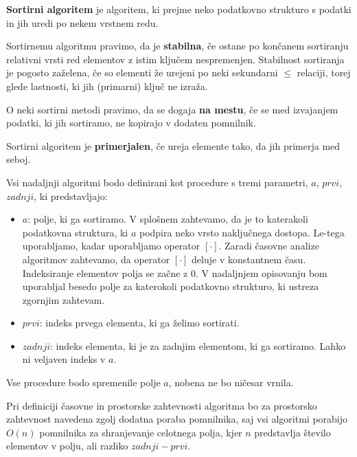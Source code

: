 \documentclass[a4paper,oneside]{article}
\begin{document}
\begin{definicija}
  \textbf{Sortirni algoritem} je algoritem, ki prejme neko podatkovno strukturo s podatki
  in jih uredi po nekem vrstnem redu.
\end{definicija}

\begin{definicija}
  Sortirnemu algoritmu pravimo, da je \textbf{stabilna}, če ostane po končanem sortiranju
  relativni vrsti red elementov z istim ključem nespremenjen.
  Stabilnost sortiranja je pogosto zaželena, če so elementi že urejeni po neki
  sekundarni $\leq$ relaciji, torej glede lastnosti, ki jih (primarni) ključ ne izraža.
\end{definicija}

\begin{definicija}
  O neki sortirni metodi pravimo, da se dogaja \textbf{na mestu}, če se med izvajanjem podatki, ki
  jih sortiramo, ne kopirajo v dodaten pomnilnik.
\end{definicija}

\begin{definicija}
  Sortirni algoritem je \textbf{primerjalen}, če ureja elemente tako, da jih primerja med seboj.
\end{definicija}


Vsi nadaljnji algoritmi bodo definirani kot procedure s tremi parametri, $a$, $prvi$,
$zadnji$, ki predstavljajo:
\begin{itemize}
  \item $a$: polje, ki ga sortiramo. V splošnem zahtevamo, da je to katerakoli podatkovna
    struktura, ki $a$ podpira neko vrsto naključnega dostopa. Le-tega uporabljamo, kadar 
    uporabljamo operator $[\cdot]$. Zaradi časovne analize algoritmov zahtevamo, da operator 
    $[\cdot]$ deluje v konstantnem času. Indeksiranje elementov polja se začne z 0.
    V nadaljnjem opisovanju bom uporabljal besedo
    polje za katerokoli podatkovno strukturo, ki ustreza zgornjim zahtevam.
  \item $prvi$: indeks prvega elementa, ki ga želimo sortirati.
  \item $zadnji$: indeks elementa, ki je za zadnjim elementom, ki ga sortiramo. Lahko ni
    veljaven indeks v $a$.
\end{itemize}
Vse procedure bodo spremenile polje $a$, nobena ne bo ničesar vrnila.

Pri definiciji časovne in prostorske zahtevnosti algoritma bo za prostorsko zahtevnost 
navedena zgolj dodatna poraba pomnilnika, saj vsi algoritmi porabijo $O(n)$ pomnilnika za
shranjevanje celotnega polja, kjer $n$ predstavlja število elementov v polju, ali razliko
$zadnji - prvi$. 
\end{document}
